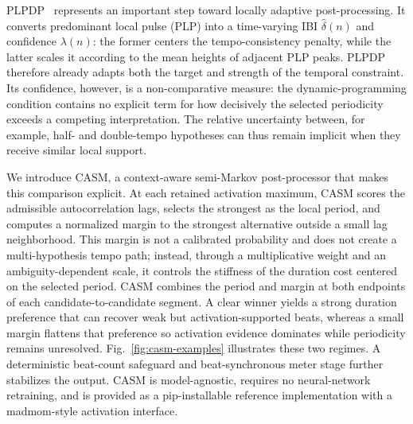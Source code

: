 \documentclass{article}
\begin{document}
PLPDP~\cite{chiu2023localperiodicity} represents an important step toward locally adaptive post-processing. It converts predominant local pulse (PLP) into a time-varying IBI $\hat{\delta}(n)$ and confidence $\lambda(n)$: the former centers the tempo-consistency penalty, while the latter scales it according to the mean heights of adjacent PLP peaks. PLPDP therefore already adapts both the target and strength of the temporal constraint. Its confidence, however, is a non-comparative measure: the dynamic-programming condition contains no explicit term for how decisively the selected periodicity exceeds a competing interpretation. The relative uncertainty between, for example, half- and double-tempo hypotheses can thus remain implicit when they receive similar local support.

We introduce CASM, a context-aware semi-Markov post-processor that makes this comparison explicit. At each retained activation maximum, CASM scores the admissible autocorrelation lags, selects the strongest as the local period, and computes a normalized margin to the strongest alternative outside a small lag neighborhood. This margin is not a calibrated probability and does not create a multi-hypothesis tempo path; instead, through a multiplicative weight and an ambiguity-dependent scale, it controls the stiffness of the duration cost centered on the selected period. CASM combines the period and margin at both endpoints of each candidate-to-candidate segment. A clear winner yields a strong duration preference that can recover weak but activation-supported beats, whereas a small margin flattens that preference so activation evidence dominates while periodicity remains unresolved. Fig.~\ref{fig:casm-examples} illustrates these two regimes. A deterministic beat-count safeguard and beat-synchronous meter stage further stabilizes the output. CASM is model-agnostic, requires no neural-network retraining, and is provided as a pip-installable reference implementation with a madmom-style activation interface.



\end{document}

